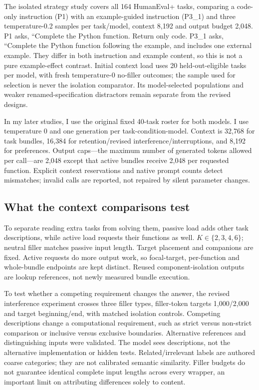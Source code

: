 \documentclass[10pt,a4paper,twocolumn]{article}
\begin{document}
The isolated strategy study covers all 164 HumanEval+ tasks, comparing a code-only instruction (P1) with an example-guided
instruction (P3\_1) and three temperature-0.2 samples per task/model, context 8,192 and output
budget 2,048. P1 asks, ``Complete the Python function. Return only code. P3\_1 asks,
``Complete the Python function following the example, and includes one external
example. They differ in both instruction and example content, so this is not
a pure example-effect contrast. Initial context load
uses 20 held-out-eligible tasks per model, with fresh temperature-0
no-filler outcomes; the sample used for selection is never the isolation
comparator. Its model-selected populations and weaker renamed-specification
distractors remain separate from the revised designs.

In my later studies, I use the original fixed 40-task roster for both models. I
use temperature 0 and one generation per task-condition-model. Context is
32,768 for task bundles, 16,384 for retention/revised interference/interruptions,
and 8,192 for preferences. Output caps---the maximum number of generated tokens allowed per call---are
2,048 except that active bundles
receive 2,048 per requested function. Explicit context reservations and native
prompt counts detect mismatches; invalid calls are reported, not repaired by
silent parameter changes.

\subsection{What the context comparisons test}
To separate reading extra tasks from solving them, passive load adds other task
descriptions, while active load requests their
functions as well. $K\in\{2,3,4,6\}$; neutral filler matches passive input
length. Target placement and companions are fixed. Active requests do more
output work, so focal-target, per-function and whole-bundle endpoints are kept
distinct. Reused component-isolation outputs are lookup references, not newly
measured bundle execution.

To test whether a competing requirement changes the answer, the revised
interference experiment crosses three filler types, filler-token targets
1,000/2,000 and target beginning/end, with matched isolation controls. Competing
descriptions change a computational requirement, such as strict versus
non-strict comparison or inclusive versus exclusive boundaries. Alternative
references and distinguishing inputs were validated. The model sees descriptions,
not the alternative implementation or hidden tests. Related/irrelevant labels
are authored coarse categories; they are not calibrated semantic similarity.
Filler budgets do not guarantee identical complete input lengths across every
wrapper, an important limit on attributing differences solely to content.
\end{document}
